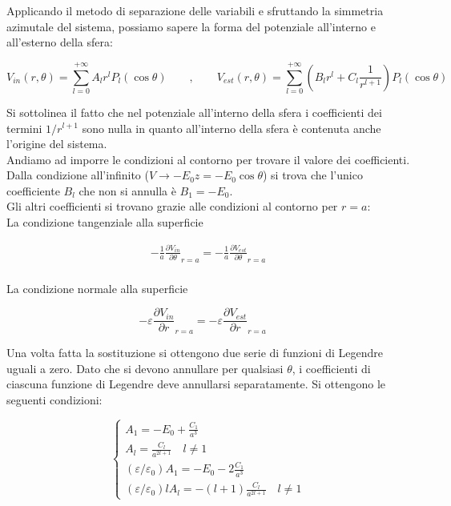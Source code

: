 Applicando il metodo di separazione delle variabili e sfruttando la simmetria azimutale del sistema, possiamo sapere la forma del potenziale all'interno e all'esterno della sfera:

\begin{equation}
    V_{in} (r, \theta) = \sum_{l= 0}^{+ \infty} A_l r^l P_l (\cos \theta) \qquad , \qquad V_{est}(r, \theta) = \sum_{l = 0} ^ {+ \infty} \left ( B_l r^l + C_l \frac{1}{r^{l+1}} \right) P_l (\cos \theta)
\end{equation}

Si sottolinea il fatto che nel potenziale all'interno della sfera i coefficienti dei termini $1/r^{l+1}$ sono nulla in quanto all'interno della sfera è contenuta anche l'origine del sistema. \\

Andiamo ad imporre le condizioni al contorno per trovare il valore dei coefficienti. \\

Dalla condizione all'infinito ($V \to - E_0 z = - E_0 \cos \theta$) si trova che l'unico coefficiente $B_l$ che non si annulla è $B_1 = -E_0$.\\

Gli altri coefficienti si trovano grazie alle condizioni al contorno per $r = a$:\\

La condizione tangenziale alla superficie

\begin{align*}
    - \frac{1}{a} \frac{\partial V_{in}}{\partial \theta} _{r= a} = - \frac{1}{a} \frac{\partial V_{est}}{\partial \theta} _{r= a}\\
\end{align*}

La condizione normale alla superficie

\begin{equation*}
    -\varepsilon \frac{\partial V_{in}}{\partial r} _{r = a} =  -\varepsilon \frac{\partial V_{est}}{\partial r} _{r = a} \quad
\end{equation*}

Una volta fatta la sostituzione si ottengono due serie di funzioni di Legendre uguali a zero. Dato che si devono annullare per qualsiasi $\theta$, i coefficienti di ciascuna funzione di Legendre deve annullarsi separatamente. Si ottengono le seguenti condizioni:

\begin{equation}
    \begin{cases}
        A_1 = - E_0 + \frac{C_1}{a^3} \\
        A_l = \frac{C_l}{a^{2l +1}} \quad  l\neq 1\\
        (\varepsilon/\varepsilon_0) A_1 = - E_0 - 2 \frac{C_1}{a^3}\\
        (\varepsilon/\varepsilon_0) l A_l = - (l+1) \frac{C_l}{a^{2l +1}} \quad l\neq 1
    \end{cases}
\end{equation}

